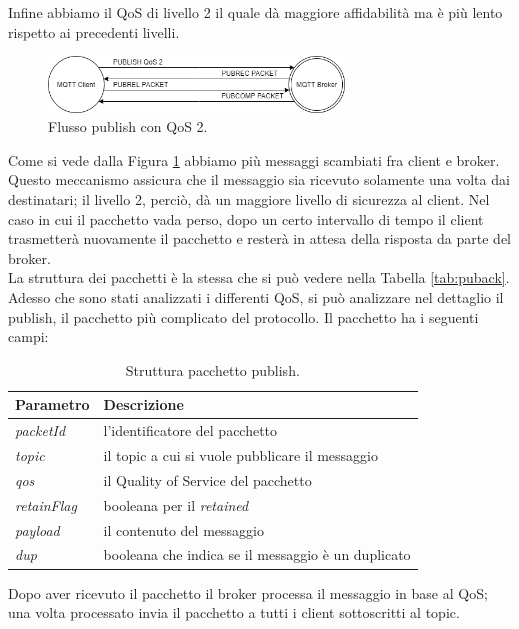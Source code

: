 \documentclass[Lau,binding=0.6cm,noexaminfo=true]{sapthesis}
\begin{document}
\begin{large}
Infine abbiamo il QoS di livello 2 il quale dà maggiore affidabilità ma è più lento rispetto ai precedenti livelli.

\begin{figure}[h]
\centering
\includegraphics[width=0.7\textwidth]{images/publish-qos2.png}
\caption{Flusso publish con QoS 2.}
\label{fig:qos-2pub}
\end{figure}

Come si vede dalla Figura \ref{fig:qos-2pub} abbiamo più messaggi scambiati fra client e broker. Questo meccanismo assicura che il messaggio sia ricevuto solamente una volta dai destinatari; il livello 2, perciò, dà un maggiore livello di sicurezza al client.
Nel caso in cui il pacchetto vada perso, dopo un certo intervallo di tempo il client trasmetterà nuovamente il pacchetto e resterà in attesa della risposta da parte del broker. \\
La struttura dei pacchetti è la stessa che si può vedere nella Tabella \ref{tab:puback}. \\

Adesso che sono stati analizzati i differenti QoS, si può analizzare nel dettaglio il publish, il pacchetto più complicato del protocollo.
Il pacchetto ha i seguenti campi:
\begin{table}[h]
\caption{Struttura pacchetto publish.}
\label{tab:publish}
\begin{tabular}{lp{}}
\toprule
\textbf{Parametro} & \textbf{Descrizione} \\
\midrule
\textit{packetId} & l'identificatore del pacchetto \\
\textit{topic} & il topic a cui si vuole pubblicare il messaggio \\
\textit{qos} & il Quality of Service del pacchetto \\
\textit{retainFlag} & booleana per il \textit{retained} \\
\textit{payload} & il contenuto del messaggio \\
\textit{dup} & booleana che indica se il messaggio è un duplicato \\
\bottomrule
\end{tabular}
\end{table}

Dopo aver ricevuto il pacchetto il broker processa il messaggio in base al QoS; una volta processato invia il pacchetto a tutti i client sottoscritti al topic.


\end{large}
\end{document}
